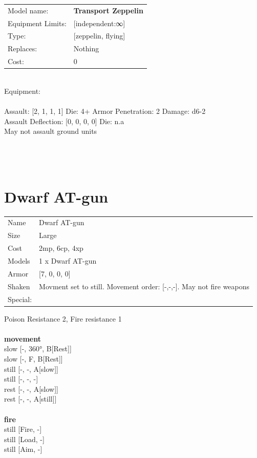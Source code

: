 \noindent
\begin{tabular}{ll}
Model name: &{\bf Transport Zeppelin } \\
Equipment Limits: &[independent:∞] \\
Type: &[zeppelin, flying] \\
Replaces: &Nothing \\
Cost: & 0\\
\end{tabular}
\ \\
Equipment:  \\
\ \\
Assault: [2, 1, 1, 1] Die: 4+ Armor Penetration: 2 Damage: d6-2 \\
Assault Deflection: [0, 0, 0, 0] Die: n.a\\
\indent May not assault ground units\\ 
 
\ \\

\ \\
 
\ \\













\clearpage

\section{ Dwarf AT-gun }

\begin{tabular}{ll}
  Name & Dwarf AT-gun \\
  Size & Large\\
  Cost & 2mp, 6cp, 4xp\\
  Models & 1 x Dwarf AT-gun\\
  Armor & [7, 0, 0, 0]\\
  Shaken & Movment set to still. Movement order: [-,-,-]. May not fire weapons\\
  Special: \\
\end{tabular}

\noindent Poison Resistance 2, Fire resistance 1\\ 


\ \\ {\bf movement } \\
slow [-, 360°, B[Rest]] \\
slow [-, F, B[Rest]] \\
still [-, -, A[slow]] \\
still [-, -, -] \\
rest [-, -, A[slow]] \\
rest [-, -, A[still]] \\
\ \\ {\bf fire } \\
still [Fire, -] \\
still [Load, -] \\
still [Aim, -] \\


